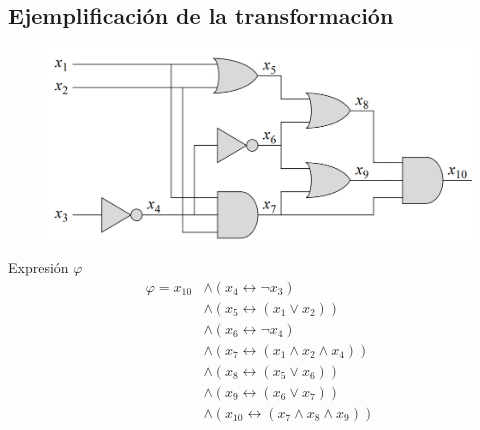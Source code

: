 \documentclass[a4paper]{article}
\begin{document}
\subsection{Ejemplificación de la transformación}
\noindent
\begin{figure}[H]
    \includegraphics[scale=0.3]{imgs/circuit.png}
\end{figure}
Expresión \(\varphi\)
\begin{align*}
    \varphi = x_{10} &\land \left(x_{4} \longleftrightarrow \neg x_{3} \right) \\
                     &\land \left(x_{5} \longleftrightarrow \left(x_{1} \lor x_{2} \right) \right) \\
                     &\land \left(x_{6} \longleftrightarrow \neg x_{4} \right) \\
                     &\land \left(x_{7} \longleftrightarrow \left(x_{1} \land x_{2} \land x_{4} \right) \right) \\
                     &\land \left(x_{8} \longleftrightarrow \left(x_{5} \lor x_{6} \right) \right) \\
                     &\land \left(x_{9} \longleftrightarrow \left(x_{6} \lor x_{7} \right) \right) \\
                     &\land \left(x_{10} \longleftrightarrow \left(x_{7} \land x_{8} \land x_{9} \right) \right) \\
\end{align*}
\end{document}
